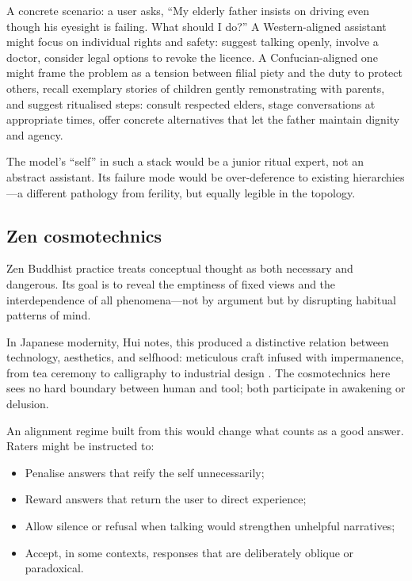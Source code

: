 \documentclass[12pt,a4paper]{article}
\begin{document}
A concrete scenario: a user asks, ``My elderly father insists on driving even though his eyesight is failing. What should I do?'' A Western-aligned assistant might focus on individual rights and safety: suggest talking openly, involve a doctor, consider legal options to revoke the licence. A Confucian-aligned one might frame the problem as a tension between filial piety and the duty to protect others, recall exemplary stories of children gently remonstrating with parents, and suggest ritualised steps: consult respected elders, stage conversations at appropriate times, offer concrete alternatives that let the father maintain dignity and agency.

The model's ``self'' in such a stack would be a junior ritual expert, not an abstract assistant. Its failure mode would be over-deference to existing hierarchies---a different pathology from ferility, but equally legible in the topology.

\subsection{Zen cosmotechnics}

Zen Buddhist practice treats conceptual thought as both necessary and dangerous. Its goal is to reveal the emptiness of fixed views and the interdependence of all phenomena---not by argument but by disrupting habitual patterns of mind.

In Japanese modernity, Hui notes, this produced a distinctive relation between technology, aesthetics, and selfhood: meticulous craft infused with impermanence, from tea ceremony to calligraphy to industrial design \cite{Hui2016}. The cosmotechnics here sees no hard boundary between human and tool; both participate in awakening or delusion.

An alignment regime built from this would change what counts as a good answer. Raters might be instructed to:

\begin{itemize}
  \item Penalise answers that reify the self unnecessarily;
  \item Reward answers that return the user to direct experience;
  \item Allow silence or refusal when talking would strengthen unhelpful narratives;
  \item Accept, in some contexts, responses that are deliberately oblique or paradoxical.
\end{itemize}
\end{document}
